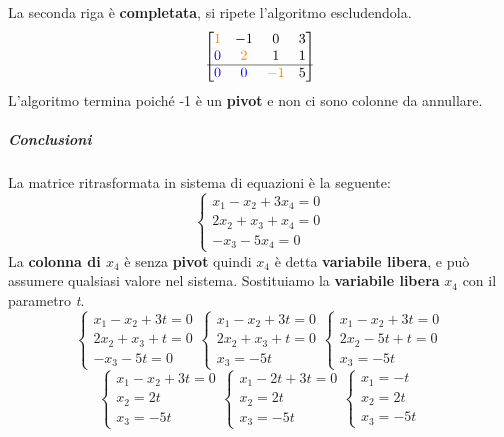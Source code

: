 \documentclass[a4paper, 12pt]{report}
\begin{document}
                La seconda riga è \textbf{completata}, si ripete l'algoritmo escludendola.
                $$
                \begin{bmatrix}
                    \textcolor{orange}{1} & -1 & 0 & 3\\
                    \textcolor{blue}{0} & \textcolor{orange}{2} & 1 & 1\\
                    \hline
                    \textcolor{blue}{0} & \textcolor{blue}{0} & \textcolor{orange}{-1} & 5
                \end{bmatrix}
                $$
                L'algoritmo termina poiché -1 è un \textbf{pivot} e non ci sono colonne da annullare.
                \subparagraph{Conclusioni}La matrice ritrasformata in sistema di equazioni è la seguente:
                $$
                \begin{cases}
                    x_1-x_2+3x_4=0\\
                    2x_2+x_3+x_4=0\\
                    -x_3-5x_4=0
                \end{cases}
                $$
                La \textbf{colonna di $x_4$} è senza \textbf{pivot} quindi \textbf{$x_4$} è detta \textbf{variabile libera}, e può assumere qualsiasi
                valore nel sistema.
                Sostituiamo la \textbf{variabile libera} $x_4$ con il parametro \textit{t}.
                $$
                \begin{cases}
                    x_1-x_2+3t=0\\
                    2x_2+x_3+t=0\\
                    -x_3-5t=0
                \end{cases}
                \begin{cases}
                    x_1-x_2+3t=0\\
                    2x_2+x_3+t=0\\
                    x_3=-5t
                \end{cases}
                \begin{cases}
                    x_1-x_2+3t=0\\
                    2x_2-5t+t=0\\
                    x_3=-5t
                \end{cases}
                $$
                $$
                \begin{cases}
                    x_1-x_2+3t=0\\
                    x_2=2t\\
                    x_3=-5t
                \end{cases}
                \begin{cases}
                    x_1-2t+3t=0\\
                    x_2=2t\\
                    x_3=-5t
                \end{cases}
                \begin{cases}
                    x_1=-t\\
                    x_2=2t\\
                    x_3=-5t
                \end{cases}
                $$ 
\end{document}
